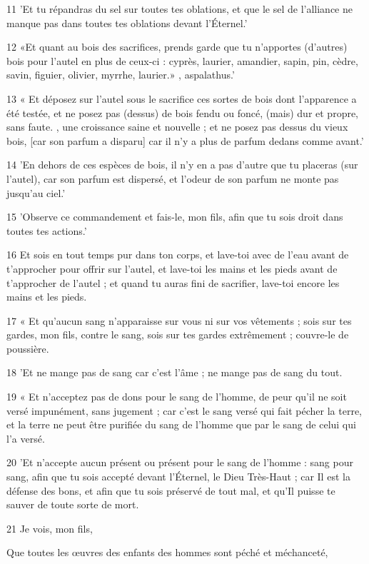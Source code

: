 \par 11 'Et tu répandras du sel sur toutes tes oblations, et que le sel de l'alliance ne manque pas dans toutes tes oblations devant l'Éternel.'
\par 12 «Et quant au bois des sacrifices, prends garde que tu n'apportes (d'autres) bois pour l'autel en plus de ceux-ci : cyprès, laurier, amandier, sapin, pin, cèdre, savin, figuier, olivier, myrrhe, laurier.» , aspalathus.'
\par 13 « Et déposez sur l'autel sous le sacrifice ces sortes de bois dont l'apparence a été testée, et ne posez pas (dessus) de bois fendu ou foncé, (mais) dur et propre, sans faute. , une croissance saine et nouvelle ; et ne posez pas dessus du vieux bois, [car son parfum a disparu] car il n'y a plus de parfum dedans comme avant.'
\par 14 'En dehors de ces espèces de bois, il n'y en a pas d'autre que tu placeras (sur l'autel), car son parfum est dispersé, et l'odeur de son parfum ne monte pas jusqu'au ciel.'
\par 15 'Observe ce commandement et fais-le, mon fils, afin que tu sois droit dans toutes tes actions.'
\par 16 Et sois en tout temps pur dans ton corps, et lave-toi avec de l'eau avant de t'approcher pour offrir sur l'autel, et lave-toi les mains et les pieds avant de t'approcher de l'autel ; et quand tu auras fini de sacrifier, lave-toi encore les mains et les pieds.
\par 17 « Et qu'aucun sang n'apparaisse sur vous ni sur vos vêtements ; sois sur tes gardes, mon fils, contre le sang, sois sur tes gardes extrêmement ; couvre-le de poussière.
\par 18 'Et ne mange pas de sang car c'est l'âme ; ne mange pas de sang du tout.
\par 19 « Et n'acceptez pas de dons pour le sang de l'homme, de peur qu'il ne soit versé impunément, sans jugement ; car c'est le sang versé qui fait pécher la terre, et la terre ne peut être purifiée du sang de l'homme que par le sang de celui qui l'a versé.
\par 20 'Et n'accepte aucun présent ou présent pour le sang de l'homme : sang pour sang, afin que tu sois accepté devant l'Éternel, le Dieu Très-Haut ; car Il est la défense des bons, et afin que tu sois préservé de tout mal, et qu'Il puisse te sauver de toute sorte de mort.
\par    
\par 21 Je vois, mon fils,  
\par     Que toutes les œuvres des enfants des hommes sont péché et méchanceté,  
